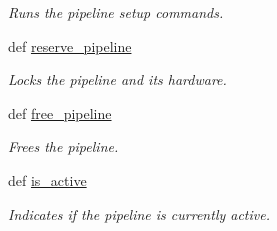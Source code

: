 \begin{DoxyCompactItemize}
\begin{DoxyCompactList}\small\item\em Runs the pipeline setup commands. \end{DoxyCompactList}\item 
def \hyperlink{classhwm_1_1hardware_1_1pipelines_1_1pipeline_1_1_pipeline_a75e2d36779704a689c0695a3065a69b9}{reserve\-\_\-pipeline}
\begin{DoxyCompactList}\small\item\em Locks the pipeline and its hardware. \end{DoxyCompactList}\item 
def \hyperlink{classhwm_1_1hardware_1_1pipelines_1_1pipeline_1_1_pipeline_abf1dafd14d616a80273d92ed59b7e70c}{free\-\_\-pipeline}
\begin{DoxyCompactList}\small\item\em Frees the pipeline. \end{DoxyCompactList}\item 
def \hyperlink{classhwm_1_1hardware_1_1pipelines_1_1pipeline_1_1_pipeline_a05272cdc6a155be84ef606be78eb6ad9}{is\-\_\-active}
\begin{DoxyCompactList}\small\item\em Indicates if the pipeline is currently active. \end{DoxyCompactList}\end{DoxyCompactItemize}
